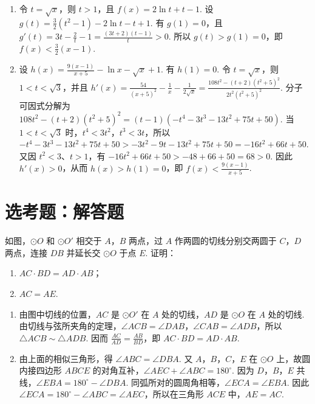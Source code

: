 \begin{solution}
\begin{enumerate}
\item 令 \(t=\sqrt{x}\)，则 \(t>1\)，且 \(f(x)=2\ln t+t-1\). 设
\(\displaystyle g(t)=\frac{3}{2}(t^2-1)-2\ln t-t+1\). 有 \(g(1)=0\)，且
\(\displaystyle g'(t)=3t-\frac{2}{t}-1=\frac{(3t+2)(t-1)}{t}>0\). 所以 \(g(t)>g(1)=0\)，即 \(\displaystyle f(x)<\frac{3}{2}(x-1)\).
\item 设 \(\displaystyle h(x)=\frac{9(x-1)}{x+5}-\ln x-\sqrt{x}+1\). 有 \(h(1)=0\). 令 \(t=\sqrt{x}\)，则 \(1<t<\sqrt{3}\)，并且
\(\displaystyle h'(x)=\frac{54}{(x+5)^2}-\frac{1}{x}-\frac{1}{2\sqrt{x}}=\frac{108t^2-(t+2)(t^2+5)^2}{2t^2(t^2+5)^2}\).
分子可因式分解为
\(\displaystyle108t^2-(t+2)(t^2+5)^2=(t-1)(-t^4-3t^3-13t^2+75t+50)\). 当 \(1<t<\sqrt{3}\) 时，\(t^4<3t^2\)，\(t^3<3t\)，所以
\(\displaystyle-t^4-3t^3-13t^2+75t+50>-3t^2-9t-13t^2+75t+50=-16t^2+66t+50\). 又因 \(t^2<3\)、\(t>1\)，有 \(-16t^2+66t+50>-48+66+50=68>0\). 因此 \(h'(x)>0\)，从而 \(h(x)>h(1)=0\)，即 \(\displaystyle f(x)<\frac{9(x-1)}{x+5}\).
\end{enumerate}
\end{solution}

\section{选考题：解答题}

\begin{problem}
如图，\(\odot O\) 和 \(\odot O'\) 相交于 \(A\)，\(B\) 两点，过 \(A\) 作两圆的切线分别交两圆于 \(C\)，\(D\) 两点，连接 \(DB\) 并延长交 \(\odot O\) 于点 \(E\). 证明：
\begin{enumerate}
\item \(AC \cdot BD = AD \cdot AB\)；
\item \(AC = AE\).
\end{enumerate}

\end{problem}

\begin{solution}
\begin{enumerate}
\item 由图中切线的位置，\(AC\) 是 \(\odot O'\) 在 \(A\) 处的切线，\(AD\) 是 \(\odot O\) 在 \(A\) 处的切线. 由切线与弦所夹角的定理，\(\angle ACB=\angle DAB\)，\(\angle CAB=\angle ADB\)，所以 \(\triangle ACB\sim\triangle ADB\). 因而
\(\displaystyle\frac{AC}{AD}=\frac{AB}{BD}\)，即 \(AC\cdot BD=AD\cdot AB\).
\item 由上面的相似三角形，得 \(\angle ABC=\angle DBA\). 又 \(A\)，\(B\)，\(C\)，\(E\) 在 \(\odot O\) 上，故圆内接四边形 \(ABCE\) 的对角互补，\(\angle AEC+\angle ABC=180^\circ\). 因为 \(D\)，\(B\)，\(E\) 共线，\(\angle EBA=180^\circ-\angle DBA\). 同弧所对的圆周角相等，\(\angle ECA=\angle EBA\). 因此 \(\angle ECA=180^\circ-\angle ABC=\angle AEC\)，所以在三角形 \(ACE\) 中，\(AE=AC\).
\end{enumerate}
\end{solution}

